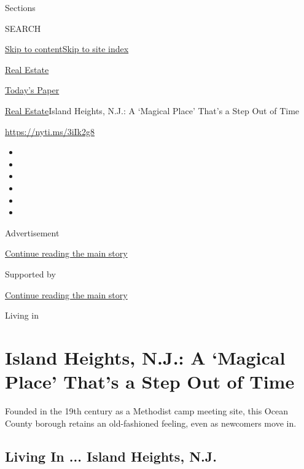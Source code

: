 Sections

SEARCH

\protect\hyperlink{site-content}{Skip to
content}\protect\hyperlink{site-index}{Skip to site index}

\href{https://www.nytimes3xbfgragh.onion/section/realestate}{Real
Estate}

\href{https://myaccount.nytimes3xbfgragh.onion/auth/login?response_type=cookie\&client_id=vi}{}

\href{https://www.nytimes3xbfgragh.onion/section/todayspaper}{Today's
Paper}

\href{/section/realestate}{Real Estate}\textbar{}Island Heights, N.J.: A
`Magical Place' That's a Step Out of Time

\url{https://nyti.ms/3iIk2g8}

\begin{itemize}
\item
\item
\item
\item
\item
\item
\end{itemize}

Advertisement

\protect\hyperlink{after-top}{Continue reading the main story}

Supported by

\protect\hyperlink{after-sponsor}{Continue reading the main story}

Living in

\hypertarget{island-heights-nj-a-magical-place-thats-a-step-out-of-time}{%
\section{Island Heights, N.J.: A `Magical Place' That's a Step Out of
Time}\label{island-heights-nj-a-magical-place-thats-a-step-out-of-time}}

Founded in the 19th century as a Methodist camp meeting site, this Ocean
County borough retains an old-fashioned feeling, even as newcomers move
in.

\href{https://www.nytimes3xbfgragh.onion/slideshow/2020/07/08/realestate/living-in-island-heights-nj.html}{}

\hypertarget{living-in--island-heights-nj}{%
\subsection{Living In ... Island Heights,
N.J.}\label{living-in--island-heights-nj}}


